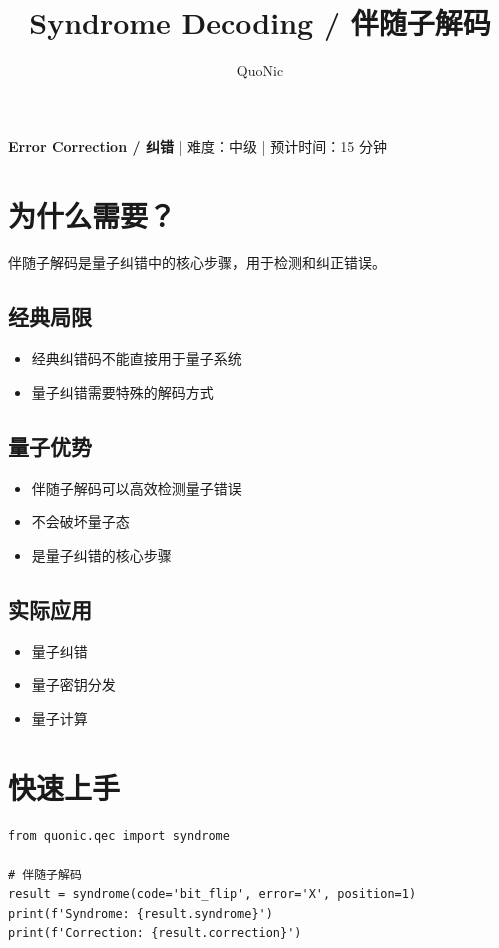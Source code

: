 \documentclass[12pt,a4paper]{article}
\title{Syndrome Decoding / 伴随子解码}
\author{QuoNic}
\date{}
\begin{document}
\maketitle

\begin{center}
\textbf{Error Correction / 纠错} | 难度：中级 | 预计时间：15 分钟
\end{center}

\tableofcontents
\newpage

\section{为什么需要？}

伴随子解码是量子纠错中的核心步骤，用于检测和纠正错误。

\subsection{经典局限}
\begin{itemize}
  \item 经典纠错码不能直接用于量子系统
  \item 量子纠错需要特殊的解码方式
\end{itemize}

\subsection{量子优势}
\begin{itemize}
  \item 伴随子解码可以高效检测量子错误
  \item 不会破坏量子态
  \item 是量子纠错的核心步骤
\end{itemize}

\subsection{实际应用}
\begin{itemize}
  \item 量子纠错
  \item 量子密钥分发
  \item 量子计算
\end{itemize}

\section{快速上手}

\begin{verbatim}
from quonic.qec import syndrome

# 伴随子解码
result = syndrome(code='bit_flip', error='X', position=1)
print(f'Syndrome: {result.syndrome}')
print(f'Correction: {result.correction}')
\end{verbatim}
\end{document}
